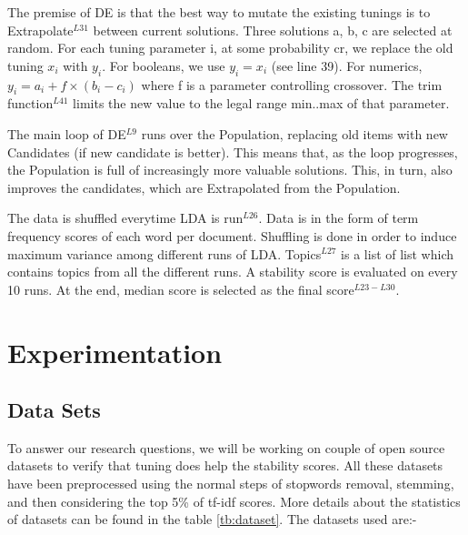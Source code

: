 \documentclass[conference]{IEEEtran}
\theoremstyle{break}
\begin{document}
The premise of DE is that the best way to mutate the existing tunings is to Extrapolate$^{L31}$ between current solutions. Three solutions a, b, c are selected at random. For each tuning parameter i, at some probability cr, we replace the old tuning $x_i$ with $y_i$. For booleans, we use $y_i = x_i$ (see line 39). For numerics, $y_i = a_i + f \times (b_i - c_i)$ where f is a parameter controlling crossover. The trim function$^{L41}$ limits the new value to the legal range min..max of that parameter.

The main loop of DE$^{L9}$ runs over the Population, replacing old items with new Candidates (if new candidate is better). This means that, as the loop progresses, the Population is full of increasingly more valuable solutions. This, in turn, also improves the candidates, which are Extrapolated from the Population.

The data is shuffled everytime LDA is run$^{L26}$. Data is in the form of term frequency scores of each word per document. Shuffling is done in order  to  induce  maximum  variance  among  different  runs of LDA. Topics$^{L27}$ is a list of list which contains topics from all the different runs. A stability score is evaluated on every 10 runs. At the end, median score is selected as the final score$^{L23-L30}$.

\section{Experimentation}

\subsection{Data Sets}
To answer our research questions, we will be working on couple of open source datasets to verify that tuning does help the stability scores. All these datasets have been preprocessed using the normal steps of stopwords removal, stemming, and then considering the top 5\% of tf-idf scores. More details about the statistics of datasets can be found in the table \ref{tb:dataset}. The datasets used are:-
\end{document}
